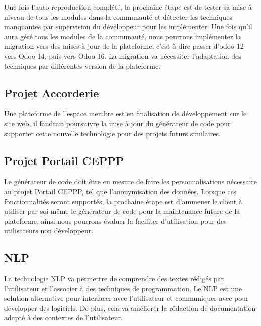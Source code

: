 Une fois l'auto-reproduction complété, la prochaine étape est de tester sa mise à niveau de tous les modules dans la communauté et détecter les techniques manquantes par supervision du développeur pour les implémenter. Une fois qu’il aura géré tous les modules de la communauté, nous pourrons implémenter la migration vers des mises à jour de la plateforme, c’est-à-dire passer d'odoo 12 vers Odoo 14, puis vers Odoo 16. La migration va nécessiter l'adaptation des techniques par différentes version de la plateforme.


\subsection{Projet Accorderie}

Une plateforme de l'espace membre est en finalisation de développement sur le site web, il faudrait poursuivre la mise à jour du générateur de code pour supporter cette nouvelle technologie pour des projets futurs similaires.


\subsection{Projet Portail CEPPP}

Le générateur de code doit être en mesure de faire les personnalisations nécessaire au projet Portail CEPPP, tel que l'anonymisation des données. Lorsque ces fonctionnalités seront supportés, la prochaine étape est d'ammener le client à utiliser par soi même le générateur de code pour la maintenance future de la plateforme, ainsi nous pourrons évaluer la faciliter d'utilisation pour des utilisateurs non développeur.

\subsection{NLP}

La technologie NLP va permettre de comprendre des textes rédigés par l’utilisateur et l’associer à des techniques de programmation. Le NLP est une solution alternative pour interfacer avec l’utilisateur et communiquer avec pour développer des logiciels. De plus, cela va améliorer la rédaction de documentation adapté à des contextes de l'utilisateur. 

